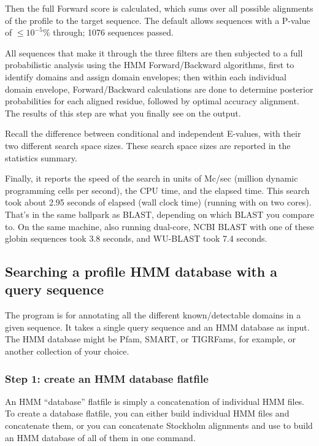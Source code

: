 Then the full Forward score is calculated, which sums over all
possible alignments of the profile to the target sequence. The default
allows sequences with a P-value of $\leq 10^{-5}$\% through; 1076
sequences passed.

All sequences that make it through the three filters are then
subjected to a full probabilistic analysis using the HMM
Forward/Backward algorithms, first to identify domains and assign
domain envelopes; then within each individual domain envelope,
Forward/Backward calculations are done to determine posterior
probabilities for each aligned residue, followed by optimal accuracy
alignment. The results of this step are what you finally see on the
output.

Recall the difference between conditional and independent E-values,
with their two different search space sizes. These search space sizes
are reported in the statistics summary.

Finally, it reports the speed of the search in units of Mc/sec
(million dynamic programming cells per second), the CPU time, and the
elapsed time. This search took about 2.95 seconds of elapsed (wall
clock time) (running with  on two cores). That's in the
same ballpark as BLAST, depending on which BLAST you compare to. On
the same machine, also running dual-core, NCBI BLAST with one of these
globin sequences took 3.8 seconds, and WU-BLAST took 7.4 seconds.

\subsection{Searching a profile HMM database with a query sequence}

The  program is for annotating all the different
known/detectable domains in a given sequence. It takes a single query
sequence and an HMM database as input. The HMM database might be Pfam,
SMART, or TIGRFams, for example, or another collection of your choice.

\subsubsection{Step 1: create an HMM database flatfile}

An HMM ``database'' flatfile is simply a concatenation of individual
HMM files. To create a database flatfile, you can either build
individual HMM files and concatenate them, or you can concatenate
Stockholm alignments and use  to build an HMM database
of all of them in one command. 

